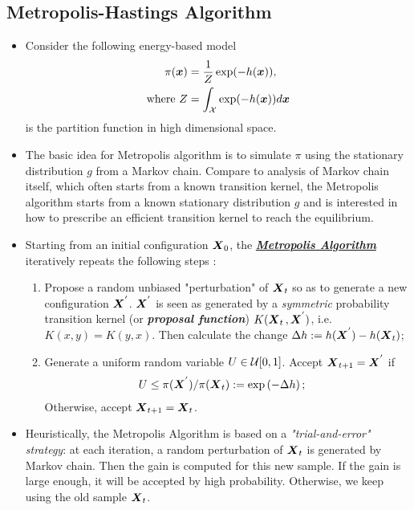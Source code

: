 \documentclass[11pt]{article}
\begin{document}
\subsection{Metropolis-Hastings Algorithm}
\begin{itemize}
\item Consider the following energy-based model
\begin{align*}
\pi(\boldsymbol{x}) &= \frac{1}{Z}\exp(- h(\boldsymbol{x})),\\
\text{where }Z&= \int_{{\mathcal X}}\exp(- h(\boldsymbol{x}))  d\boldsymbol{x} 
\end{align*} is the partition function in high dimensional space.

\item The basic idea for Metropolis algorithm is to simulate $\pi$ using the stationary distribution $g$ from a Markov chain. Compare to analysis of Markov chain itself, which often starts from a known transition kernel, the Metropolis algorithm starts from a known stationary distribution $g$ and is interested in how to prescribe an efficient transition kernel to reach the equilibrium.

\item Starting from an initial configuration $\boldsymbol{X}_{0}$, the \underline{\textbf{\emph{Metropolis Algorithm}}} iteratively repeats the following steps \citep{liu2001monte}:
\begin{enumerate}
\item Propose a random unbiased "perturbation" of $\boldsymbol{X}_{t}$ so as to generate a new configuration $\boldsymbol{X}^{'}$. $\boldsymbol{X}^{'}$ is seen as generated by a \emph{symmetric} probability transition kernel (or \emph{\textbf{proposal function}}) $K(\boldsymbol{X}_{t}\,, \boldsymbol{X}^{'})$, i.e. $K(x, y) = K(y, x)$. Then calculate the change $\Delta h := h(\boldsymbol{X}^{'}) - h(\boldsymbol{X}_{t})$;

\item Generate a uniform random variable $U\in {\mathcal U}[0,1]$. Accept $\boldsymbol{X}_{t+1} = \boldsymbol{X}^{'}$ if
\begin{align*}
U &\le \pi(\boldsymbol{X}^{'}) / \pi(\boldsymbol{X}_{t}) := \exp\left(- \Delta h\right);
\end{align*} Otherwise, accept $\boldsymbol{X}_{t+1} = \boldsymbol{X}_{t}$.
\end{enumerate}

\item Heuristically, the Metropolis Algorithm is based on a \emph{"trial-and-error" strategy}: at each iteration, a random perturbation of $\boldsymbol{X}_{t}$ is generated by Markov chain. Then the gain is computed for this new sample. If the gain is large enough, it will be accepted by high probability. Otherwise, we keep using the old sample $\boldsymbol{X}_{t}$.


\end{itemize}
\end{document}
